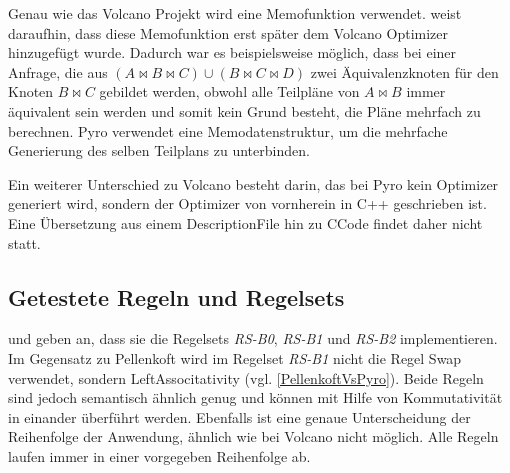 Genau wie das Volcano Projekt wird eine Memofunktion verwendet. \cite{roy2001multi} weist daraufhin, dass diese Memofunktion erst später dem Volcano Optimizer hinzugefügt wurde. Dadurch war es beispielsweise möglich, dass bei einer Anfrage, die aus $(A \Join B \Join C) \cup (B \Join C \Join D)$ zwei Äquivalenzknoten für den Knoten $B \Join C$ gebildet werden, obwohl alle Teilpläne von $A \Join B$ immer äquivalent sein werden und somit kein Grund besteht, die Pläne mehrfach zu berechnen. Pyro verwendet eine Memodatenstruktur, um die mehrfache Generierung des selben Teilplans zu unterbinden.

Ein weiterer Unterschied zu Volcano besteht darin, das  bei Pyro kein Optimizer generiert wird, sondern der Optimizer von vornherein in C++ geschrieben ist. Eine Übersetzung aus einem Description\-File hin zu C\-Code findet daher nicht statt.

\subsection{Getestete Regeln und Regelsets}

\cite{shanbhag2014optimizing} und \cite{roy2001multi} geben an, dass sie die Regelsets \textit{RS-B0}, \textit{RS-B1} und \textit{RS-B2} implementieren. Im Gegensatz zu Pellenkoft wird im Regelset \textit{RS-B1} nicht die Regel Swap verwendet, sondern Left\-Associtativity (vgl. \ref{PellenkoftVsPyro}). Beide Regeln sind jedoch semantisch ähnlich genug und können mit Hilfe von Kommutativität in einander überführt werden. Ebenfalls ist eine genaue Unterscheidung der Reihenfolge der Anwendung, ähnlich wie bei Volcano nicht möglich. Alle Regeln laufen immer in einer vorgegeben Reihenfolge ab.

